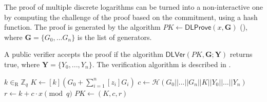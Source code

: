 The proof of multiple discrete logarithms can be turned into a non-interactive one by computing the challenge of the proof based on the commitment, using a hash function. The proof is generated by the algorithm $PK \gets \mathsf{DLProve}(x, \boldsymbol{G})$ (), where $\boldsymbol{G} = \{G_0, ... G_n\}$ is the list of generators.

A public verifier accepts the proof if the algorithm $\mathsf{DLVer}(PK, \boldsymbol{G}; \boldsymbol{Y})$ returns true, where $\boldsymbol{Y} = \{Y_0, ..., Y_n\}$. The verification algorithm is described in .

\begin{algorithm}[ht]
    \DontPrintSemicolon
    \caption{$\mathsf{DLProve} (x, \boldsymbol{G})$}
    
    $k \in_\mathrm{R} \mathbb{Z}_q$ \;
    $K \gets [k](G_0 + \sum\limits_{i=1}^n [z_i]G_i)$ \;
    $c \gets \mathcal{H}(G_0 || ... || G_n || K || Y_0 || ... || Y_n)$ \;
    $r \gets k + c \cdot x \pmod q$ \;
    $PK \gets (K, c, r)$ \;
     
    
    \label{alg: dl prove}
\end{algorithm}

\begin{algorithm}[ht]
    \DontPrintSemicolon
    \caption{$\mathsf{DLVer}(PK, \boldsymbol{G}; \boldsymbol{Y})$}
    
     
    
    \label{alg: dl ver}
\end{algorithm}
